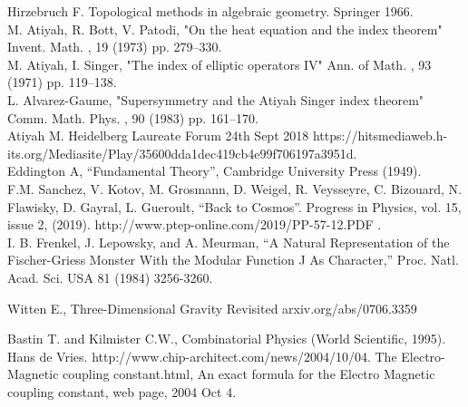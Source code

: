 \documentclass[a4paper,9pt]{article}
\begin{document}
\begin{thebibliography}{99}
 Hirzebruch F. Topological methods in algebraic geometry. Springer 1966.\\
 M. Atiyah, R. Bott, V. Patodi, "On the heat equation and the index theorem" Invent. Math. , 19 (1973) pp. 279--330.\\
 M. Atiyah, I. Singer, "The index of elliptic operators IV" Ann. of Math. , 93 (1971) pp. 119--138. \\
 L. Alvarez-Gaume, "Supersymmetry and the Atiyah Singer index theorem" Comm. Math. Phys. , 90 (1983) pp. 161--170.\\
 Atiyah M. Heidelberg Laureate Forum 24th Sept 2018 https://hitsmediaweb.h-its.org/Mediasite/Play/35600dda1dec419cb4e99f706197a3951d. \\ 
 Eddington A, ``Fundamental Theory'', Cambridge University Press (1949).\\
 F.M. Sanchez, V. Kotov, M. Grosmann, D. Weigel, R. Veysseyre, C. Bizouard, N. Flawisky, D. Gayral, L. Gueroult, ``Back to Cosmos''. Progress in Physics, vol. 15, issue 2, (2019). http://www.ptep-online.com/2019/PP-57-12.PDF .\\

 I. B. Frenkel, J. Lepowsky, and A. Meurman, “A Natural Representation of the Fischer-Griess Monster With the Modular Function J As Character,” Proc. Natl. Acad. Sci. USA 81 (1984) 3256-3260. 

 Witten E., Three-Dimensional Gravity Revisited arxiv.org/abs/0706.3359 


 Bastin T. and Kilmister C.W., Combinatorial Physics (World Scientific, 1995).\\
 Hans de Vries. http://www.chip-architect.com/news/2004/10/04. The Electro-Magnetic coupling constant.html, An exact formula for the Electro Magnetic coupling constant, web page, 2004 Oct 4.\\ 


\end{thebibliography}
\end{document}
